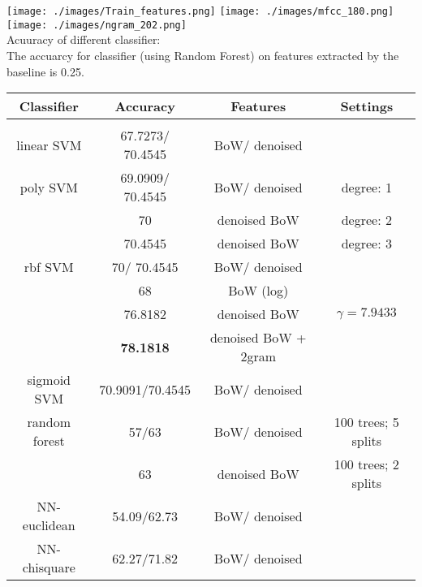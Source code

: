 \footnotesize
\texttt{[image: ./images/Train\_features.png]}
\texttt{[image: ./images/mfcc\_180.png]}
\texttt{[image: ./images/ngram\_202.png]}\\
\footnotesize
Acuuracy of different classifier: \\
The accuarcy for classifier (using Random Forest) on features extracted by the baseline is 0.25. 


\begin{tabular}{cccc}
\multicolumn{1}{c}{\bf Classifier }&\multicolumn{1}{c}{\bf Accuracy}  &\multicolumn{1}{c}{\bf Features} &\multicolumn{1}{c}{\bf Settings}
\\ \hline \\
linear SVM		&67.7273/ 70.4545 		&BoW/ denoised 		&  \\
poly SVM		&69.0909/ 70.4545  	&BoW/ denoised  	& degree: 1  \\
			& 70 			& denoised BoW 	& degree: 2  \\
			& 70.4545  	& denoised BoW 	& degree: 3  \\
rbf SVM       	&70/ 	70.4545  	&BoW/ denoised 		&  \\
                     	&68  			&  BoW (log) 	&  \\
          		&76.8182  		&  denoised BoW 	&  $\gamma = 7.9433$ \\
          		&{\bf 78.1818}  	&  denoised BoW + 2gram 	&    \\
sigmoid SVM     	&70.9091/70.4545	&BoW/ denoised 		&  \\
random forest    	&57/63 			& BoW/ denoised 	& 100 trees; 5 splits \\
       			&63  			& denoised BoW 	& 100 trees; 2 splits \\
NN-euclidean   	&54.09/62.73		& BoW/ denoised 	&  \\
NN-chisquare	&62.27/71.82		& BoW/ denoised 	&  \\

\end{tabular}


